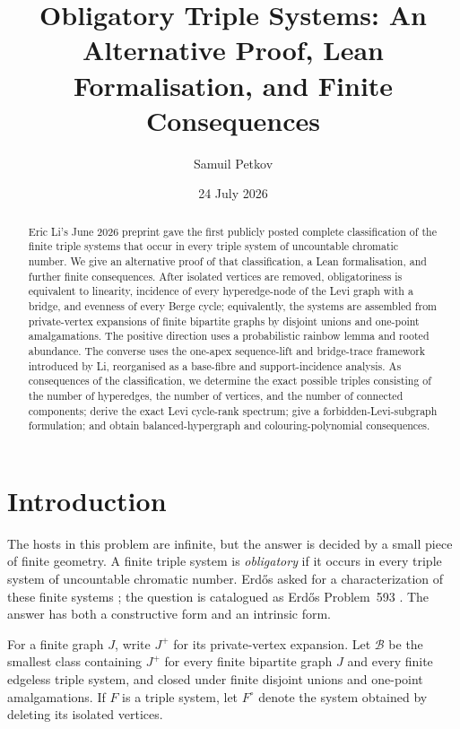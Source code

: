 \documentclass[a4paper,11pt,reqno]{amsart}
\title[Obligatory triple systems]{Obligatory Triple Systems: An Alternative Proof, Lean Formalisation, and Finite Consequences}
\author{Samuil Petkov}
\date{24 July 2026}
\theoremstyle{plain}
\theoremstyle{definition}
\theoremstyle{remark}
\begin{document}
\begin{abstract}
Eric Li's June 2026 preprint gave the first publicly posted complete
classification of the finite triple systems that occur in every triple system
of uncountable chromatic number.  We give an alternative proof of that
classification, a Lean formalisation, and further finite consequences.  After
isolated vertices are removed, obligatoriness is equivalent to linearity,
incidence of every hyperedge-node of the Levi graph with a bridge, and evenness
of every Berge cycle; equivalently, the systems are assembled from
private-vertex expansions of finite bipartite graphs by disjoint unions and
one-point amalgamations.  The positive direction uses a probabilistic rainbow
lemma and rooted abundance.  The converse uses the one-apex sequence-lift and
bridge-trace framework introduced by Li, reorganised as a base-fibre and
support-incidence analysis.  As consequences of the classification, we
determine the exact possible triples consisting of the number of hyperedges,
the number of vertices, and the number of connected components; derive the
exact Levi cycle-rank spectrum; give a forbidden-Levi-subgraph formulation;
and obtain balanced-hypergraph and colouring-polynomial consequences.
\end{abstract}

\maketitle

\section*{Introduction}\label{introduction}

The hosts in this problem are infinite, but the answer is decided by a small
piece of finite geometry.  A finite triple system is \emph{obligatory} if it
occurs in every triple system of uncountable chromatic number.  Erdős asked for a characterization
of these finite systems \citep{erdos1995}; the question is catalogued as
Erdős Problem~593 \citep{bloom593}.  The answer has both a constructive form
and an intrinsic form.

For a finite graph $J$, write $J^+$ for its private-vertex expansion.  Let
$\mathcal B$ be the smallest class containing $J^+$ for every finite
bipartite graph $J$ and every finite edgeless triple system, and closed under
finite disjoint unions and one-point amalgamations.  If $F$ is a triple
system, let $F^\circ$ denote the system obtained by deleting its isolated
vertices.
\end{document}
